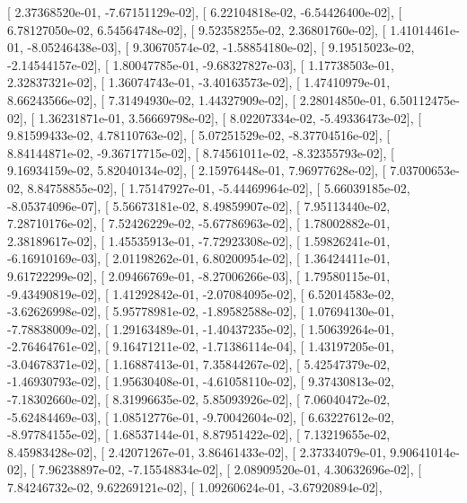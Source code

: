 \documentclass{article}
\begin{document}
       [  2.37368520e-01,  -7.67151129e-02],
       [  6.22104818e-02,  -6.54426400e-02],
       [  6.78127050e-02,   6.54564748e-02],
       [  9.52358255e-02,   2.36801760e-02],
       [  1.41014461e-01,  -8.05246438e-03],
       [  9.30670574e-02,  -1.58854180e-02],
       [  9.19515023e-02,  -2.14544157e-02],
       [  1.80047785e-01,  -9.68327827e-03],
       [  1.17738503e-01,   2.32837321e-02],
       [  1.36074743e-01,  -3.40163573e-02],
       [  1.47410979e-01,   8.66243566e-02],
       [  7.31494930e-02,   1.44327909e-02],
       [  2.28014850e-01,   6.50112475e-02],
       [  1.36231871e-01,   3.56669798e-02],
       [  8.02207334e-02,  -5.49336473e-02],
       [  9.81599433e-02,   4.78110763e-02],
       [  5.07251529e-02,  -8.37704516e-02],
       [  8.84144871e-02,  -9.36717715e-02],
       [  8.74561011e-02,  -8.32355793e-02],
       [  9.16934159e-02,   5.82040134e-02],
       [  2.15976448e-01,   7.96977628e-02],
       [  7.03700653e-02,   8.84758855e-02],
       [  1.75147927e-01,  -5.44469964e-02],
       [  5.66039185e-02,  -8.05374096e-07],
       [  5.56673181e-02,   8.49859907e-02],
       [  7.95113440e-02,   7.28710176e-02],
       [  7.52426229e-02,  -5.67786963e-02],
       [  1.78002882e-01,   2.38189617e-02],
       [  1.45535913e-01,  -7.72923308e-02],
       [  1.59826241e-01,  -6.16910169e-03],
       [  2.01198262e-01,   6.80200954e-02],
       [  1.36424411e-01,   9.61722299e-02],
       [  2.09466769e-01,  -8.27006266e-03],
       [  1.79580115e-01,  -9.43490819e-02],
       [  1.41292842e-01,  -2.07084095e-02],
       [  6.52014583e-02,  -3.62626998e-02],
       [  5.95778981e-02,  -1.89582588e-02],
       [  1.07694130e-01,  -7.78838009e-02],
       [  1.29163489e-01,  -1.40437235e-02],
       [  1.50639264e-01,  -2.76464761e-02],
       [  9.16471211e-02,  -1.71386114e-04],
       [  1.43197205e-01,  -3.04678371e-02],
       [  1.16887413e-01,   7.35844267e-02],
       [  5.42547379e-02,  -1.46930793e-02],
       [  1.95630408e-01,  -4.61058110e-02],
       [  9.37430813e-02,  -7.18302660e-02],
       [  8.31996635e-02,   5.85093926e-02],
       [  7.06040472e-02,  -5.62484469e-03],
       [  1.08512776e-01,  -9.70042604e-02],
       [  6.63227612e-02,  -8.97784155e-02],
       [  1.68537144e-01,   8.87951422e-02],
       [  7.13219655e-02,   8.45983428e-02],
       [  2.42071267e-01,   3.86461433e-02],
       [  2.37334079e-01,   9.90641014e-02],
       [  7.96238897e-02,  -7.15548834e-02],
       [  2.08909520e-01,   4.30632696e-02],
       [  7.84246732e-02,   9.62269121e-02],
       [  1.09260624e-01,  -3.67920894e-02],
\end{document}
